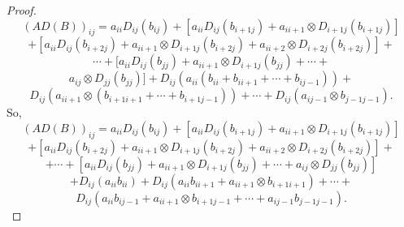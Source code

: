 \documentclass[12pt, reqno]{amsart}
\theoremstyle{definition}
\numberwithin{equation}{section}
\begin{document}
\begin{proof}
$$(AD(B))_{ij}=a_{ii}  D_{ij}(b_{ij})+[a_{ii}  D_{ij}(b_{i+1j})+a_{ii+1}\otimes D_{i+1j}(b_{i+1j})]$$$$+[a_{ii}  D_{ij}(b_{i+2j})+a_{ii+1}\otimes D_{i+1j}(b_{i+2j})+a_{ii+2}\otimes D_{i+2j}(b_ {i+2j})]+$$$$\cdots+[a_{ii}  D_{ij}(b_{jj})+a_{ii+1}\otimes D_{i+1j}(b_{jj})+\cdots+$$$$a_{ij}\otimes D_{jj}(b_{jj})]+D_{ij}(a_{ii} (b_{ii}+b_{ii+1}+\cdots+b_{ij-1}))+$$$$D_{ij}(a_{ii+1}\otimes(b_{i+1i+1}+\cdots+b_{i+1j-1}))+\cdots+ D_{ij}(a_{ij-1}\otimes b_{j-1j-1}).$$ So, $$(AD(B))_{ij}=a_{ii}  D_{ij}(b_{ij})+[a_{ii}  D_{ij}(b_{i+1j})+a_{ii+1}\otimes D_{i+1j}(b_{i+1j})]$$$$+[a_{ii}  D_{ij}(b_{i+2j})+a_{ii+1}\otimes D_{i+1j}(b_{i+2j})+a_{ii+2}\otimes D_{i+2j}(b_ {i+2j})]+$$$$+\cdots+[a_{ii}  D_{ij}(b_{jj})+a_{ii+1}\otimes D_{i+1j}(b_{jj})+\cdots+a_{ij}\otimes D_{jj}(b_{jj})]$$$$+D_{ij}(a_{ii}  b_{ii})+D_{ij}(a_{ii}  b_{ii+1}+a_{ii+1}\otimes b_{i+1i+1})+\cdots+$$$$D_{ij}(a_{ii} b_{ij-1}+a_{ii+1}\otimes b_{i+1j-1}+\cdots + a_{ij-1}b_{j-1j-1}).$$

\end{proof}
\end{document}
